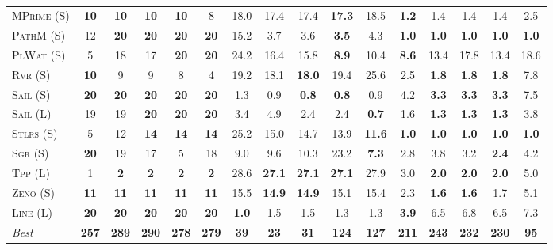 \documentclass[11pt,landscape]{article}
\begin{document}
\begin{table}[tb]
{\begin{tabular}{|l||ccccc||ccccc||ccccc||}
\textsc{MPrime} (S)&\textbf{10}&\textbf{10}&\textbf{10}&\textbf{10}&8&18.0&17.4&17.4&\textbf{17.3}&18.5&\textbf{1.2}&1.4&1.4&1.4&2.5\\
\textsc{PathM} (S)&12&\textbf{20}&\textbf{20}&\textbf{20}&\textbf{20}&15.2&3.7&3.6&\textbf{3.5}&4.3&\textbf{1.0}&\textbf{1.0}&\textbf{1.0}&\textbf{1.0}&\textbf{1.0}\\
\textsc{PlWat} (S)&5&18&17&\textbf{20}&\textbf{20}&24.2&16.4&15.8&\textbf{8.9}&10.4&\textbf{8.6}&13.4&17.8&13.4&18.6\\
\textsc{Rvr} (S)&\textbf{10}&9&9&8&4&19.2&18.1&\textbf{18.0}&19.4&25.6&2.5&\textbf{1.8}&\textbf{1.8}&\textbf{1.8}&7.8\\
\textsc{Sail} (S)&\textbf{20}&\textbf{20}&\textbf{20}&\textbf{20}&\textbf{20}&1.3&0.9&\textbf{0.8}&\textbf{0.8}&0.9&4.2&\textbf{3.3}&\textbf{3.3}&\textbf{3.3}&7.5\\
\textsc{Sail} (L)&19&19&\textbf{20}&\textbf{20}&\textbf{20}&3.4&4.9&2.4&2.4&\textbf{0.7}&1.6&\textbf{1.3}&\textbf{1.3}&\textbf{1.3}&3.8\\
\textsc{Stlrs} (S)&5&12&\textbf{14}&\textbf{14}&\textbf{14}&25.2&15.0&14.7&13.9&\textbf{11.6}&\textbf{1.0}&\textbf{1.0}&\textbf{1.0}&\textbf{1.0}&\textbf{1.0}\\
\textsc{Sgr} (S)&\textbf{20}&19&17&5&18&9.0&9.6&10.3&23.2&\textbf{7.3}&2.8&3.8&3.2&\textbf{2.4}&4.2\\
\textsc{Tpp} (L)&1&\textbf{2}&\textbf{2}&\textbf{2}&\textbf{2}&28.6&\textbf{27.1}&\textbf{27.1}&\textbf{27.1}&27.9&3.0&\textbf{2.0}&\textbf{2.0}&\textbf{2.0}&5.0\\
\textsc{Zeno} (S)&\textbf{11}&\textbf{11}&\textbf{11}&\textbf{11}&\textbf{11}&15.5&\textbf{14.9}&\textbf{14.9}&15.1&15.4&2.3&\textbf{1.6}&\textbf{1.6}&1.7&5.1\\
\textsc{Line} (L)&\textbf{20}&\textbf{20}&\textbf{20}&\textbf{20}&\textbf{20}&\textbf{1.0}&1.5&1.5&1.3&1.3&\textbf{3.9}&6.5&6.8&6.5&7.3
\\\hline
\textit{Best}&\textbf{257}&\textbf{289}&\textbf{290}&\textbf{278}&\textbf{279}&\textbf{39}&\textbf{23}&\textbf{31}&\textbf{124}&\textbf{127}&\textbf{211}&\textbf{243}&\textbf{232}&\textbf{230}&\textbf{95}\\\hline

        \end{tabular}}
        \caption{}
        \label{tab:table-1}
        \end{table}
        
\end{document}
